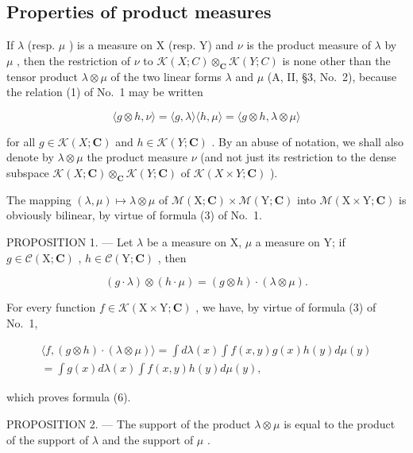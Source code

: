 \subsection{Properties of product measures}

If \(\lambda\) (resp. \(\mu\) ) is a measure on X (resp. Y) and \(\nu\) is the product measure of \(\lambda\) by \(\mu\) , then the restriction of \(\nu\) to \(\mathcal{K}(X;C)\otimes_{\mathbf{C}}\mathcal{K}(Y;C)\) is none other than the tensor product \(\lambda\otimes\mu\) of the two linear forms \(\lambda\) and \(\mu\) (A, II, §3, No.~2), because the relation (1) of No.~1 may be written

\[
\langle g \otimes h, \nu \rangle = \langle g, \lambda \rangle \langle h, \mu \rangle = \langle g \otimes h, \lambda \otimes \mu \rangle
\]

for all \(g \in \mathcal{K}(X; \mathbf{C})\) and \(h \in \mathcal{K}(Y; \mathbf{C})\) . By an abuse of notation, we shall also denote by \(\lambda \otimes \mu\) the product measure \(\nu\) (and not just its restriction to the dense subspace \(\mathcal{K}(X; \mathbf{C}) \otimes_{\mathbf{C}} \mathcal{K}(Y; \mathbf{C})\) of \(\mathcal{K}(X \times Y; \mathbf{C})\) ).

The mapping \((\lambda, \mu) \mapsto \lambda \otimes \mu\) of \(\mathcal{M}(\mathrm{X}; \mathbf{C}) \times \mathcal{M}(\mathrm{Y}; \mathbf{C})\) into \(\mathcal{M}(\mathrm{X} \times \mathrm{Y}; \mathbf{C})\) is obviously bilinear, by virtue of formula (3) of No.~1.

PROPOSITION 1. --- Let \(\lambda\) be a measure on X, \(\mu\) a measure on Y; if \(g \in \mathcal{C}(\mathrm{X};\mathbf{C})\) , \(h \in \mathcal{C}(\mathrm{Y};\mathbf{C})\) , then

\[
(g \cdot \lambda) \otimes (h \cdot \mu) = (g \otimes h) \cdot (\lambda \otimes \mu).\tag{6}
\]

For every function \(f \in \mathcal{K}(\mathrm{X} \times \mathrm{Y}; \mathbf{C})\) , we have, by virtue of formula (3) of No.~1,

\[
\begin{array}{c} \langle f, (g \otimes h) \cdot (\lambda \otimes \mu) \rangle = \int d \lambda (x) \int f (x, y) g (x) h (y) d \mu (y) \\ = \int g (x) d \lambda (x) \int f (x, y) h (y) d \mu (y), \end{array}
\]

which proves formula (6).

PROPOSITION 2. --- The support of the product \(\lambda \otimes \mu\) is equal to the product of the support of \(\lambda\) and the support of \(\mu\) .

